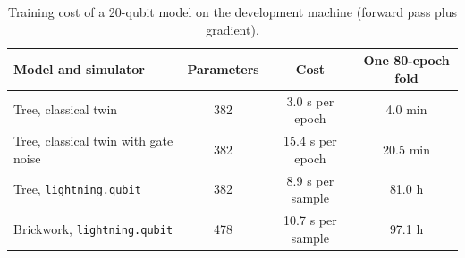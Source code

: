 \begin{table}[tbp]
\centering
\caption{Training cost of a 20-qubit model on the development machine (forward pass plus gradient).}
\label{tab:s_qubit20}
\small
\begin{tabular}{lccc}
\toprule
Model and simulator & Parameters & Cost & One 80-epoch fold \\
\midrule
Tree, classical twin & \num{382} & \num{3.0} s per epoch & \num{4.0} min \\
Tree, classical twin with gate noise & \num{382} & \num{15.4} s per epoch & \num{20.5} min \\
Tree, \texttt{lightning.qubit} & \num{382} & \num{8.9} s per sample & \num{81.0} h \\
Brickwork, \texttt{lightning.qubit} & \num{478} & \num{10.7} s per sample & \num{97.1} h \\
\bottomrule
\end{tabular}
\end{table}
